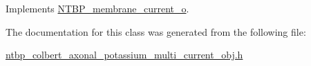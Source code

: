 Implements \hyperlink{class_n_t_b_p__membrane__current__o_a423b482d830c9c70098502114477c057}{NTBP\_\-membrane\_\-current\_\-o}.



The documentation for this class was generated from the following file:\begin{DoxyCompactItemize}
\item 
\hyperlink{ntbp__colbert__axonal__potassium__multi__current__obj_8h}{ntbp\_\-colbert\_\-axonal\_\-potassium\_\-multi\_\-current\_\-obj.h}\end{DoxyCompactItemize}
